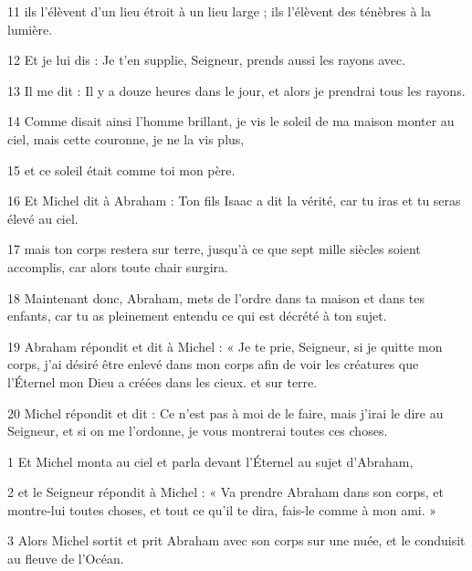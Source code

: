 \par 11 ils l'élèvent d'un lieu étroit à un lieu large ; ils l'élèvent des ténèbres à la lumière.

\par 12 Et je lui dis : Je t'en supplie, Seigneur, prends aussi les rayons avec.

\par 13 Il me dit : Il y a douze heures dans le jour, et alors je prendrai tous les rayons.

\par 14 Comme disait ainsi l'homme brillant, je vis le soleil de ma maison monter au ciel, mais cette couronne, je ne la vis plus,

\par 15 et ce soleil était comme toi mon père.

\par 16 Et Michel dit à Abraham : Ton fils Isaac a dit la vérité, car tu iras et tu seras élevé au ciel.

\par 17 mais ton corps restera sur terre, jusqu'à ce que sept mille siècles soient accomplis, car alors toute chair surgira.

\par 18 Maintenant donc, Abraham, mets de l'ordre dans ta maison et dans tes enfants, car tu as pleinement entendu ce qui est décrété à ton sujet.

\par 19 Abraham répondit et dit à Michel : « Je te prie, Seigneur, si je quitte mon corps, j'ai désiré être enlevé dans mon corps afin de voir les créatures que l'Éternel mon Dieu a créées dans les cieux. et sur terre.

\par 20 Michel répondit et dit : Ce n'est pas à moi de le faire, mais j'irai le dire au Seigneur, et si on me l'ordonne, je vous montrerai toutes ces choses.


\par 1 Et Michel monta au ciel et parla devant l'Éternel au sujet d'Abraham,

\par 2 et le Seigneur répondit à Michel : « Va prendre Abraham dans son corps, et montre-lui toutes choses, et tout ce qu'il te dira, fais-le comme à mon ami. »

\par 3 Alors Michel sortit et prit Abraham avec son corps sur une nuée, et le conduisit au fleuve de l'Océan.

